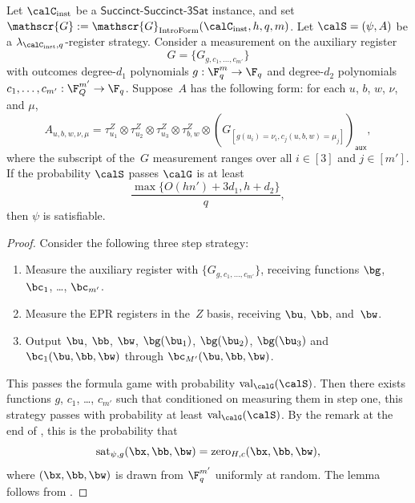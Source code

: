 \documentclass[11pt]{article}
\newcommand{\succinctsquared}{\mathsf{Succinct}\text{-}\mathsf{Succinct}\text{-}\mathsf{3Sat}}
\newcommand{\game}{\mathscr{G}}
\newcommand{\valstrat}[2]{\mathrm{val}_{#1}(#2)}
\newcommand{\reg}[1]{{\mathsf{#1}}}
\begin{document}
\begin{lemma}\label{lem:polynomial-means-good}
Let $\calC_{\mathrm{inst}}$ be a $\succinctsquared$ instance, and set $\game := \game_{\mathrm{IntroForm}}(\calC_{\mathrm{inst}}, h, q, m)$.
Let $\calS = (\psi, A)$ be a $\lambda_{\calC_{\mathrm{inst}}, q}$-register strategy.
Consider a measurement on the auxiliary register
\begin{equation*}
G = \{G_{g, c_1, \ldots, c_{m'}}\}
\end{equation*}
with outcomes degree-$d_1$ polynomials $g:\F_q^m \rightarrow \F_q$
and degree-$d_2$ polynomials $c_1, \ldots, c_{m'}: \F_Q^{m'} \rightarrow \F_q$.
Suppose~$A$ has the following form: for each $u$, $b$, $w$, $\nu$, and $\mu$,
\begin{equation}\label{eq:weird-form}
A_{u, b, w, \nu, \mu} = \tau^Z_{u_1} \otimes \tau^Z_{u_2} \otimes \tau^Z_{u_3} \otimes \tau^Z_{b, w} \otimes \left(G_{[g(u_i)= \nu_i,  c_j(u, b, w)= \mu_j]}\right)_{\reg{aux}},
\end{equation}
where the subscript of the~$G$ measurement ranges over all $i \in [3]$ and $j \in [m']$.
If the probability $\calS$ passes $\calG$ is at least
\begin{equation*}
\frac{\max\{O(h n') + 3 d_1, h + d_2\}}{q},
\end{equation*}
then $\psi$ is satisfiable.
\end{lemma}
\begin{proof}
Consider the following three step strategy:
\begin{enumerate}
\item Measure the auxiliary register with $\{G_{g, c_1, \ldots, c_{m'}}\}$, receiving functions $\bg$, $\bc_1$, \ldots, $\bc_{m'}$.
\item Measure the EPR registers in the~$Z$ basis, receiving $\bu$, $\bb$, and~$\bw$.
\item Output $\bu$, $\bb$, $\bw$, $\bg(\bu_1)$, $\bg(\bu_2)$, $\bg(\bu_3)$ and $\bc_1(\bu,\bb, \bw)$ through $\bc_{M'}(\bu, \bb, \bw)$.
\end{enumerate}
This passes the formula game with probability $\valstrat{\calG}{\calS}$.
Then there exists functions $g$, $c_1$, \ldots, $c_{m'}$ such that conditioned on measuring them in step one,
this strategy passes with probability at least $\valstrat{\calG}{\calS}$.
By the remark at the end of ,
this is the probability that
\begin{equation*}
\mathrm{sat}_{\psi, g}(\bx, \bb, \bw) = \mathrm{zero}_{H, c}(\bx, \bb, \bw),
\end{equation*}
where $(\bx, \bb, \bw)$ is drawn from $\F_q^{m'}$ uniformly at random.
The lemma follows from .
\end{proof}
\end{document}
